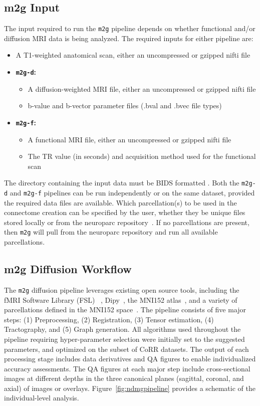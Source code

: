 \subsection{m2g Input}
The input required to run the \texttt{m2g} pipeline depends on whether functional and/or diffusion MRI data is being analyzed. The required inputs for either pipeline are:
\begin{itemize}
    \item A T1-weighted anatomical scan, either an uncompressed or gzipped nifti file
    \item \textbf{\texttt{m2g-d}:} 
    \begin{itemize}
        \item A diffusion-weighted MRI file, either an uncompressed or gzipped nifti file
        \item b-value and b-vector parameter files (.bval and .bvec file types)
    \end{itemize}
    \item \textbf{\texttt{m2g-f}:} \begin{itemize}
        \item A functional MRI file, either an uncompressed or gzipped nifti file
        \item The TR value (in seconds) and acquisition method used for the functional scan
    \end{itemize}
\end{itemize}
The directory containing the input data must be BIDS formatted \cite{bidspec}. Both the \texttt{m2g-d} and \texttt{m2g-f} pipelines can be run independently or on the same dataset, provided the required data files are available. Which parcellation(s) to be used in the connectome creation can be specified by the user, whether they be unique files stored locally or from the neuroparc repository~\cite{neuroparc}. If no parcellations are present, then \texttt{m2g} will pull from the neuroparc repository and run all available parcellations.

\subsection{m2g Diffusion Workflow}
The \texttt{m2g} diffusion pipeline leverages existing open source tools, including the fMRI Software Library (FSL) ~\cite{fsl1, fsl2, fsl3}, Dipy~\cite{dipy}, the MNI152 atlas~\cite{mni152}, and a variety of parcellations defined in the MNI152 space~\cite{neuroparc}. The pipeline consists of five major steps: (1) Preprocessing, (2) Registration, (3) Tensor estimation, (4) Tractography, and (5) Graph generation.
All algorithms used throughout the pipeline requiring hyper-parameter selection were initially set to the suggested parameters, and optimized on the subset of CoRR datasets. The output of each processing stage includes data derivatives and QA figures to enable individualized accuracy assessments. The QA figures at each major step include cross-sectional images at different depths in the three canonical planes (sagittal, coronal, and axial) of images or overlays. Figure~\ref{fig:ndmgpipeline} provides a schematic of the individual-level analysis.

